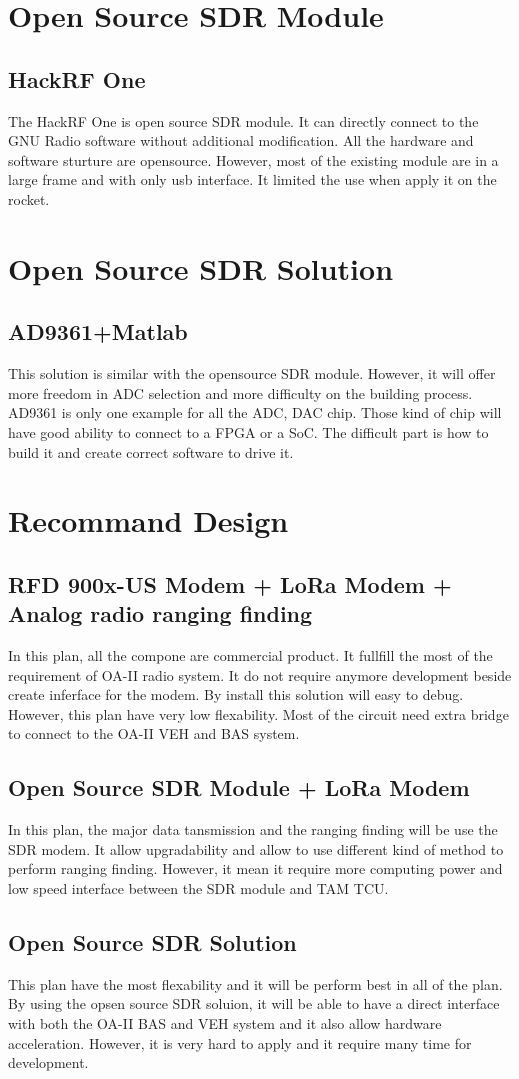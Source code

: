 \documentclass[12pt,article]{memoir}
\begin{document}
\chapter{Open Source SDR Module}
\section{HackRF One}
The HackRF One is open source SDR module. It can directly connect to the GNU Radio software without additional modification. All the hardware and software sturture are opensource. However, most of the existing module are in a large frame and with only usb interface. It limited the use when apply it on the rocket.
\newpage
\chapter{Open Source SDR Solution}
\section{AD9361+Matlab}
This solution is similar with the opensource SDR module. However, it will offer more freedom in ADC selection and more difficulty on the building process. AD9361 is only one example for all the ADC, DAC chip. Those kind of chip will have good ability to connect to a FPGA or a SoC. The difficult part is how to build it and create correct software to drive it.
\newpage
\chapter{Recommand Design}
\section{RFD 900x-US Modem + LoRa Modem + Analog radio ranging finding} 
In this plan, all the compone are commercial product. It fullfill the most of the requirement of OA-II radio system. It do not require anymore development beside create inferface for the modem. By install this solution will easy to debug. However, this plan have very low flexability. Most of the circuit need extra bridge to connect to the OA-II VEH and BAS system. 
\section{Open Source SDR Module + LoRa Modem}
In this plan, the major data tansmission and the ranging finding will be use the SDR modem. It allow upgradability and allow to use different kind of method to perform ranging finding. However, it mean it require more computing power and low speed interface between the SDR module and TAM TCU.
\section{Open Source SDR Solution}
This plan have the most flexability and it will be perform best in all of the plan. By using the opsen source SDR soluion, it will be able to have a direct interface with both the OA-II BAS and VEH system and it also allow hardware acceleration. However, it is very hard to apply and it require many time for development.
\newpage
\end{document}
